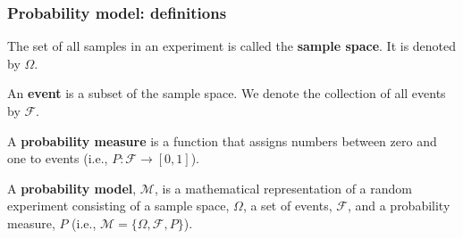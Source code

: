 \begin{frame}
    \frametitle{Probability model: definitions}

    \begin{probDef*}

        The set of all samples in an experiment is called the \textbf{sample
        space}. It is denoted by $\Omega$.

    \end{probDef*}


    \footnotesize
    \begin{probDef*}[Event]

        An \textbf{event} is a subset of the sample space. We denote the
        collection of all events by $\mathcal{F}$.

    \end{probDef*}

    \begin{probDef*}

        A \textbf{probability measure} is a function that assigns numbers
        between zero and one to events (i.e., $P:\mathcal{F}\rightarrow
        [0,1]$).

    \end{probDef*}

    \begin{probDef*}

        A \textbf{probability model}, $\mathcal{M}$, is a mathematical representation of a
        random experiment consisting of a sample space, $\Omega$, a set of
        events, $\mathcal{F}$, and a probability measure, $P$ (i.e.,
        $\mathcal{M}=\{\Omega,\mathcal{F},P\}$).

    \end{probDef*}
    \normalsize

\end{frame}

